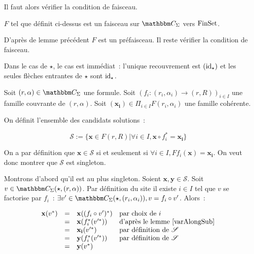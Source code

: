 Il faut alors vérifier la condition de faisceau.

\begin{lem}
    $F$ tel que définit ci-dessus est un faisceau sur $\C_\Sigma$ vers $\text{FinSet}$.
\end{lem}

\begin{pv}
    D'après de lemme précédent $F$ est un préfaisceau. Il reste vérifier la condition
    de faisceau.

    Dans le cas de $\star$, le cas est immédiat~: l'unique recouvrement est $(\operatorname{id}_\star)$
    et les seules flèches entrantes de $\star$ sont $\operatorname{id}_\star$.

    Soit $(r,\alpha)\in\C_\Sigma$ une formule. Soit $(f_i : (r_i,
    \alpha_i)\rightarrow (r,R))_{i\in I}$ une famille couvrante de
    $(r,\alpha)$.  Soit $(\mathbf{x_i})\in\Pi_{i\in I} F(r_i,\alpha_i)$ une
    famille cohérente.

    On définit l'ensemble des candidats solutions~:

    \[\mathscr{S} := \{ \mathbf{x}\in F(r,R)
                      | \forall i\in I, \mathbf{x}\circ f_i^* = \mathbf{x_i} \} \]

    On a par définition que $\mathbf{x}\in\mathscr{S}$ si et seulement si
    $\forall i\in I, Ff_i(\mathbf{x}) = \mathbf{x_i}$. On veut donc montrer que
    $\mathscr{S}$ est singleton.

    Montrons d'abord qu'il est au plus singleton. Soient $\mathbf{x},
    \mathbf{y}\in\mathscr{S}$. Soit $v\in\C_\Sigma(\star,(r,\alpha))$.
    Par définition du site il existe $i\in I$ tel que $v$ se factorise
    par $f_i$~: $\exists v'\in\C_\Sigma(\star,(r_i,\alpha_i)), v = f_i\circ v'$.
    Alors~:
    
    \[\begin{array}{rcll}
        \mathbf{x}(v^*) & = & \mathbf{x}((f_i\circ v')^*)
                                 & \text{par choix de } i \\
                        & = & \mathbf{x}(f_i^*(v'^*))
                                 & \text{d'après le lemme \ref{varAlongSub}} \\
                        & = & \mathbf{x_i}(v'^*)
                                 & \text{par définition de }\mathscr{S}\\
                        & = & \mathbf{y}(f_i^*(v'^*))
                                 & \text{par définition de }\mathscr{S}\\
                        & = & \mathbf{y}(v^*) & \\
    \end{array}\]


\end{pv}
